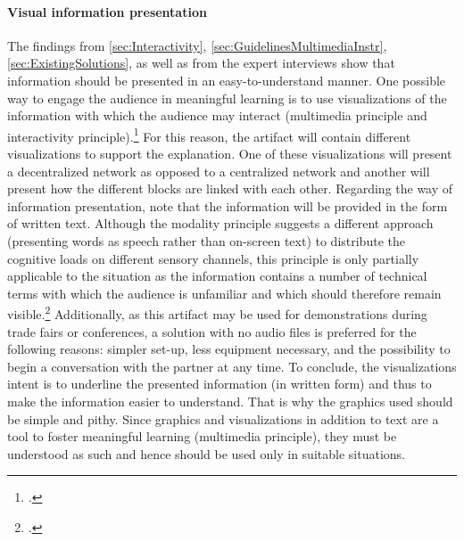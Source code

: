 
\paragraph{Visual information presentation} The findings from \ref{sec:Interactivity}, \ref{sec:GuidelinesMultimediaInstr}, \ref{sec:ExistingSolutions}, as well as from the expert interviews show that information should be presented in an easy-to-understand manner. One possible way to engage the audience in meaningful learning is to use visualizations of the information with which the audience may interact (multimedia principle and interactivity principle).\footcites[Cf.][]{RalphBeckmann_Interview}[cf.][p.1025]{DomagkInteractivitymultimedialearning2010}[cf.][p.311]{MorenoInteractiveMultimodalLearning2007}[cf.][p.290]{Betrancourtanimationinteractivityprinciples2005} For this reason, the artifact will contain different visualizations to support the explanation. One of these visualizations will present a decentralized network as opposed to a centralized network and another will present how the different blocks are linked with each other. Regarding the way of information presentation, note that the information will be provided in the form of written text. Although the modality principle suggests a different approach (presenting words as speech rather than on-screen text) to distribute the cognitive loads on different sensory channels, this principle is only partially applicable to the situation as the information contains a number of technical terms with which the audience is unfamiliar and which should therefore remain visible.\footcite[Cf.][chapter 6, paragraph 1]{ClarkElearningscienceinstruction2016} Additionally, as this artifact may be used for demonstrations during trade fairs or conferences, a solution with no audio files is preferred for the following reasons: simpler set-up, less equipment necessary, and the possibility to begin a conversation with the partner at any time. To conclude, the visualizations intent is to underline the presented information (in written form) and thus to make the information easier to understand. That is why the graphics used should be simple and pithy. Since graphics and visualizations in addition to text are a tool to foster meaningful learning (multimedia principle), they must be understood as such and hence should be used only in suitable situations. 


